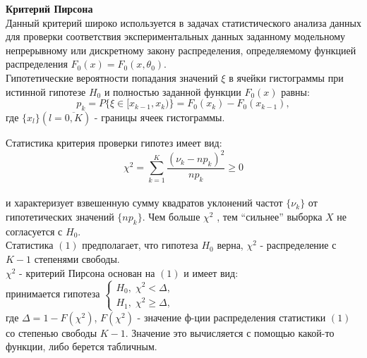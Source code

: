 \documentclass[12pt]{article}
\begin{document}
\begin{enumerate}
\par \textbf{Критерий Пирсона}
\\Данный критерий широко используется в задачах статистического анализа данных для проверки соответствия экспериментальных данных заданному модельному непрерывному или дискретному закону распределения, определяемому функцией распределения $ F_{0}(x)=F_{0}(x, \theta_{0}) $. 
\\Гипотетические вероятности попадания значений $ \xi $ в ячейки гистограммы при истинной гипотезе $ H_{0} $ и полностью заданной функции $ F_{0}(x) $ равны:
$$
p_k = P \lbrace \xi \in [x_{k - 1}, x_k) \rbrace = F_0 (x_k) - F_0 (x_{k - 1}),
$$
где $ \lbrace x_l \rbrace (l = \overline{0, K}) $ - границы ячеек гистограммы. 
\newpage
\par Статистика критерия проверки гипотез имеет вид:
\begin{equation}
\chi^2 = \sum_{k = 1}^K \frac{(\nu_k - np_k)^2}{np_k} \geq 0
\end{equation}
\\и характеризует взвешенную сумму квадратов уклонений частот $ \lbrace \nu_k \rbrace $ от гипотетических значений $ \lbrace np_k \rbrace $. Чем больше $ \chi^2 $ , тем “сильнее” выборка $ X $ не согласуется с $ H_0 $. 
\\ Статистика $ (1) $ предполагает, что гипотеза $ H_0 $ верна, $ \chi^2 $ - распределение с $ K - 1 $ степенями свободы.
\\ $ \chi^2 $ - критерий Пирсона основан на $ (1) $ и имеет вид:
\\принимается гипотеза 
$ 
	\begin{cases}
			H_{0},\; \chi^2 < \Delta, \\
			H_{1},\; \chi^2 \geq \Delta,
	\end{cases} 
$
\\где $ \Delta = 1 - F(\chi^2) $, $ F(\chi^2) $ - значение ф-ции распределения статистики $ (1) $ со степенью свободы $ K - 1 $. Значение это вычисляется с помощью какой-то функции, либо берется табличным. 

\end{enumerate}
\end{document}
